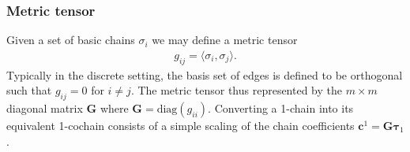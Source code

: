 \subsubsection{Metric tensor}

Given a set of basic chains $\sigma_i$ we may define a metric tensor 
\begin{align*}
g_{ij} = \langle \sigma_i, \sigma_j \rangle.
\end{align*}
Typically in the discrete setting, the basis set of edges is defined to be orthogonal such that $g_{ij}=0$ for $i \neq j$. The metric tensor thus represented by the $m \times m$ diagonal matrix $\mathbf{G}$ where $\mathbf{G}=\text{diag}(g_{ii})$. Converting a 1-chain into its equivalent 1-cochain consists of a simple scaling of the chain coefficients $\mathbf{c}^1 = \mathbf{G} \mathbf{\tau}_1$.

